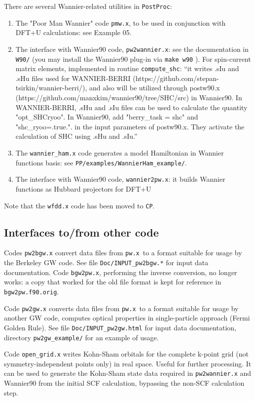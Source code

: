\documentclass[12pt,a4paper]{article}
\def\pwx{\texttt{pw.x}}
\def\CP{\texttt{CP}}
\def\PostProc{\texttt{PostProc}}
\begin{document}
There are several Wannier-related utilities in \PostProc:
\begin{enumerate}
\item The "Poor Man Wannier" code \texttt{pmw.x}, to be used
in conjunction with DFT+U calculations: see Example 05.
\item The interface with Wannier90 code, \texttt{pw2wannier.x}:
see the documentation in \texttt{W90/} (you may install the 
Wannier90 plug-in via \texttt{make w90} ). For spin-current
matrix elements, implemented in routine \texttt{compute\_shc}:
``it writes .sIu and .sHu files used for
WANNIER-BERRI (https://github.com/stepan-tsirkin/wannier-berri/),
and also will be utilized through postw90.x
(https://github.com/manxkim/wannier90/tree/SHC/src) in Wannier90.
In WANNIER-BERRI, .sHu and .sIu files can be used to calculate the
quantity "opt\_SHCryoo". In Wannier90, add "berry\_task = shc" and
"shc\_ryoo=.true.". in the input parameters of postw90.x. They
activate the calculation of SHC using .sHu and .sIu.''
\item The \texttt{wannier\_ham.x} code generates a model Hamiltonian 
in Wannier functions basis: see \texttt{PP/examples/WannierHam\_example/}.
\item The interface with Wannier90 code, \texttt{wannier2pw.x}:
it builds Wannier functions as Hubbard projectors for DFT+U
\end{enumerate}
Note that the \texttt{wfdd.x} code has been moved to \CP.

\subsection{Interfaces to/from other code}

Codes \texttt{pw2bgw.x} convert data files from \pwx\ to a format suitable
for usage by the Berkeley GW code. See file \texttt{Doc/INPUT\_pw2bgw.*}
for input data documentation. Code \texttt{bgw2pw.x}, performing the
inverse conversion, no longer works: a copy that worked for the old
file format is kept for reference in \texttt{bgw2pw.f90.orig}.

Code \texttt{pw2gw.x} converts data files from \pwx\ to a format suitable 
for usage by another GW code, computes optical properties in single-particle 
approach (Fermi Golden Rule). See file \texttt{Doc/INPUT\_pw2gw.html}
for input data documentation, directory \texttt{pw2gw\_example/}
for an example of usage.

Code \texttt{open\_grid.x} writes Kohn-Sham orbitals for the complete
k-point grid (not symmetry-independent points only) in real space.
Useful for further processing. It can be used to generate the
Kohn-Sham state data required in \texttt{pw2wannier.x} and Wannier90
from the initial SCF calculation, bypassing the non-SCF calculation
step.
\end{document}
